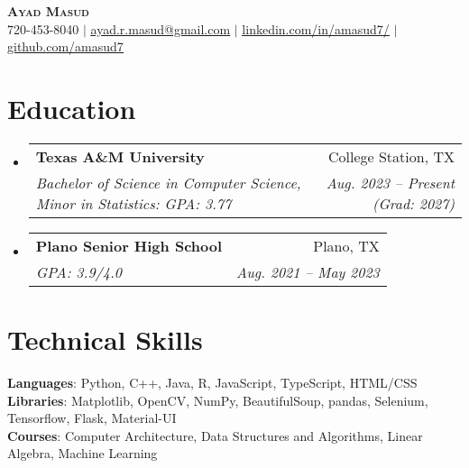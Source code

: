 \documentclass[letterpaper,11pt]{article}
\makeatletter
\newcommand{\resumeSubheading}[4]{
  \vspace{-2pt}\item
    \begin{tabular*}{0.97\textwidth}[t]{l@{\extracolsep{\fill}}r}
      \textbf{#1} & #2 \\
      \textit{\small#3} & \textit{\small #4} \\
    \end{tabular*}\vspace{-7pt}
}
\newcommand{\resumeSubHeadingListStart}{\begin{itemize}[leftmargin=0.15in, label={}]}
\newcommand{\resumeSubHeadingListEnd}{\end{itemize}}
\makeatother
\begin{document}

\begin{center}
    \textbf{\Huge \scshape Ayad Masud} \\ \vspace{1pt}
    \small 720-453-8040 $|$ \href{mailto:ayad.r.masud@gmail.com}{\underline{ayad.r.masud@gmail.com}} $|$ 
    \href{https://linkedin.com/in/amasud7}{\underline{linkedin.com/in/amasud7/}} $|$
    \href{https://github.com/amasud7}{\underline{github.com/amasud7}}
\end{center}


\section{Education}
  \resumeSubHeadingListStart
    \resumeSubheading
      {Texas A\&M University}{College Station, TX}
      {Bachelor of Science in Computer Science, Minor in Statistics: GPA: 3.77}{Aug. 2023 -- Present (Grad: 2027)}
    \resumeSubheading
      {Plano Senior High School}{Plano, TX}
      {GPA: 3.9/4.0}{Aug. 2021 -- May 2023}
  \resumeSubHeadingListEnd


\section{Technical Skills}
\begin{itemize}[leftmargin=0.15in, label={}]
   \small{\item{
    \textbf{Languages}{: Python, C++, Java, R, JavaScript, TypeScript, HTML/CSS} \\
    \textbf{Libraries}{: Matplotlib, OpenCV, NumPy, BeautifulSoup, pandas, Selenium, Tensorflow, Flask, Material-UI} \\
    \textbf{Courses}{: Computer Architecture, Data Structures and Algorithms, Linear Algebra, Machine Learning}
   }}
\end{itemize}

\end{document}
